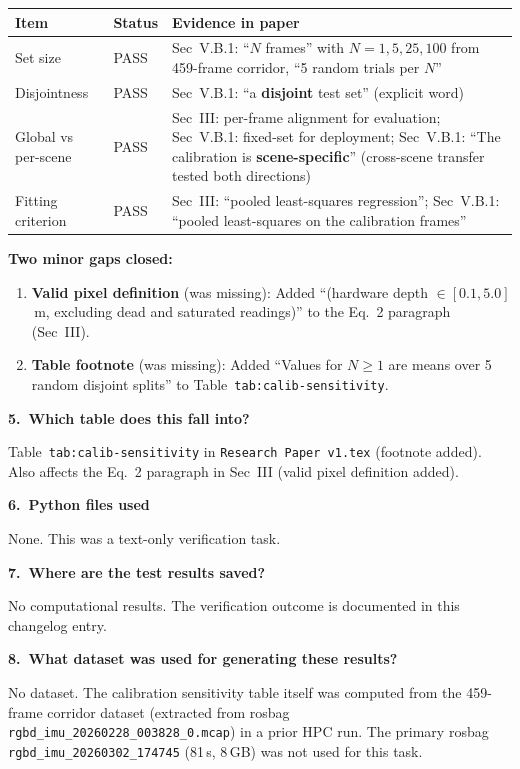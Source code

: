 \documentclass[11pt,a4paper]{article}
\begin{document}
\begin{longtable}{p{3.5cm}p{1.2cm}p{6.5cm}}
\toprule
\textbf{Item} & \textbf{Status} & \textbf{Evidence in paper} \\
\midrule
Set size & \textcolor{improved}{PASS} &
  Sec~V.B.1: ``$N$ frames'' with $N = 1, 5, 25, 100$ from
  459-frame corridor, ``5 random trials per $N$'' \\
Disjointness & \textcolor{improved}{PASS} &
  Sec~V.B.1: ``a \textbf{disjoint} test set'' (explicit word) \\
Global vs per-scene & \textcolor{improved}{PASS} &
  Sec~III: per-frame alignment for evaluation;
  Sec~V.B.1: fixed-set for deployment;
  Sec~V.B.1: ``The calibration is \textbf{scene-specific}''
  (cross-scene transfer tested both directions) \\
Fitting criterion & \textcolor{improved}{PASS} &
  Sec~III: ``pooled least-squares regression'';
  Sec~V.B.1: ``pooled least-squares on the calibration frames'' \\
\bottomrule
\end{longtable}

\textbf{Two minor gaps closed:}

\begin{enumerate}[nosep]
  \item \textbf{Valid pixel definition} (was missing): Added
    ``(hardware depth $\in [0.1, 5.0]$\,m, excluding dead and
    saturated readings)'' to the Eq.~2 paragraph (Sec~III).
  \item \textbf{Table footnote} (was missing): Added ``Values for
    $N \geq 1$ are means over 5 random disjoint splits'' to
    Table~\texttt{tab:calib-sensitivity}.
\end{enumerate}

\textbf{5.\ Which table does this fall into?}

Table~\texttt{tab:calib-sensitivity} in \texttt{Research Paper v1.tex}
(footnote added). Also affects the Eq.~2 paragraph in Sec~III
(valid pixel definition added).

\textbf{6.\ Python files used}

None. This was a text-only verification task.

\textbf{7.\ Where are the test results saved?}

No computational results. The verification outcome is documented in
this changelog entry.

\textbf{8.\ What dataset was used for generating these results?}

No dataset. The calibration sensitivity table itself was computed
from the 459-frame corridor dataset (extracted from rosbag
\texttt{rgbd\_imu\_20260228\_003828\_0.mcap}) in a prior HPC run.
The primary rosbag \texttt{rgbd\_imu\_20260302\_174745} (81\,s,
8\,GB) was not used for this task.
\end{document}

